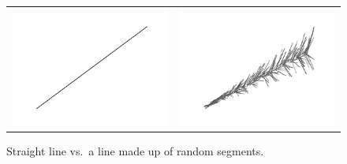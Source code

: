 \begin{figure}
\begin{center}
\begin{tabular}{ll}
\includegraphics[scale=1]{images-cmyk/straight-line} &
\includegraphics[scale=1]{images-cmyk/random-line-art} \\
\end{tabular}
\end{center}
\caption{Straight line vs.~a line made up of random segments.}
\label{fig:line-art}
\end{figure}

